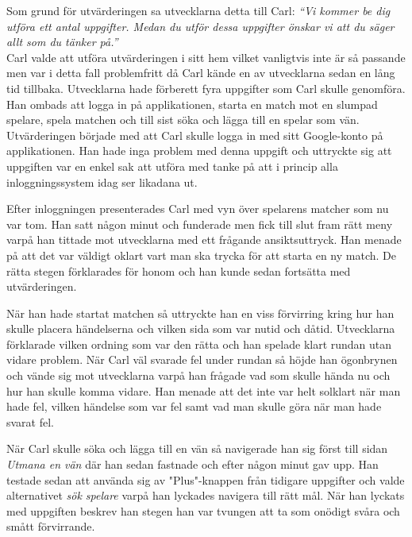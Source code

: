\documentclass[a4paper, 11pt]{article}
\begin{document}
Som grund för utvärderingen sa utvecklarna detta till Carl: \textit{``Vi kommer be dig utföra ett antal uppgifter. Medan du utför dessa uppgifter önskar vi att du säger allt som du tänker på.''}\\
Carl valde att utföra utvärderingen i sitt hem vilket vanligtvis inte är så passande men var i detta fall problemfritt då Carl kände en av utvecklarna sedan en lång tid tillbaka.
Utvecklarna hade förberett fyra uppgifter som Carl skulle genomföra. Han ombads att logga in på applikationen, starta en match mot en slumpad spelare, spela matchen och till sist söka och lägga till en spelar som vän. 
Utvärderingen började med att Carl skulle logga in med sitt Google-konto på applikationen. Han hade inga problem med denna uppgift och uttryckte sig att uppgiften var en enkel sak att utföra med tanke på att i princip alla inloggningssystem idag ser likadana ut.


Efter inloggningen presenterades Carl med vyn över spelarens matcher som nu var tom. Han satt någon minut och funderade men fick till slut fram rätt meny varpå han tittade mot utvecklarna med ett frågande ansiktsuttryck. Han menade på att det var väldigt oklart vart man ska trycka för att starta en ny match. De rätta stegen förklarades för honom och han kunde sedan fortsätta med utvärderingen.


När han hade startat matchen så uttryckte han en viss förvirring kring hur han skulle placera händelserna och vilken sida som var nutid och dåtid. Utvecklarna förklarade vilken ordning som var den rätta och han spelade klart rundan utan vidare problem. När Carl väl svarade fel under rundan så höjde han ögonbrynen och vände sig mot utvecklarna varpå han frågade vad som skulle hända nu och hur han skulle komma vidare. Han menade att det inte var helt solklart när man hade fel, vilken händelse som var fel samt vad man skulle göra när man hade svarat fel.


När Carl skulle söka och lägga till en vän så navigerade han sig först till sidan \textit{Utmana en vän} där han sedan fastnade och efter någon minut gav upp. Han testade sedan att använda sig av "Plus"-knappen från tidigare uppgifter och valde alternativet \textit{sök spelare} varpå han lyckades navigera till rätt mål. När han lyckats med uppgiften beskrev han stegen han var tvungen att ta som onödigt svåra och smått förvirrande. 
\end{document}
